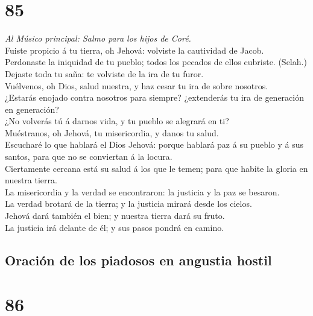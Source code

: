 \hypertarget{section-84}{%
\section{85}\label{section-84}}

 \emph{Al Músico principal: Salmo para los hijos de Coré.}\\
Fuiste propicio á tu tierra, oh Jehová: volviste la cautividad de
Jacob.\\
 Perdonaste la iniquidad de tu pueblo; todos los pecados de
ellos cubriste. (Selah.)\\
 Dejaste toda tu saña: te volviste de la ira de tu furor.\\
 Vuélvenos, oh Dios, salud nuestra, y haz cesar tu ira de
sobre nosotros.\\
 ¿Estarás enojado contra nosotros para siempre? ¿extenderás
tu ira de generación en generación?\\
 ¿No volverás tú á darnos vida, y tu pueblo se alegrará en
ti?\\
 Muéstranos, oh Jehová, tu misericordia, y danos tu salud.\\
 Escucharé lo que hablará el Dios Jehová: porque hablará paz
á su pueblo y á sus santos, para que no se conviertan á la locura.\\
 Ciertamente cercana está su salud á los que le temen; para
que habite la gloria en nuestra tierra.\\
 La misericordia y la verdad se encontraron: la justicia y
la paz se besaron.\\
 La verdad brotará de la tierra; y la justicia mirará desde
los cielos.\\
 Jehová dará también el bien; y nuestra tierra dará su
fruto.\\
 La justicia irá delante de él; y sus pasos pondrá en
camino.

\hypertarget{oraciuxf3n-de-los-piadosos-en-angustia-hostil}{%
\subsection{Oración de los piadosos en angustia
hostil}\label{oraciuxf3n-de-los-piadosos-en-angustia-hostil}}

\hypertarget{section-85}{%
\section{86}\label{section-85}}


